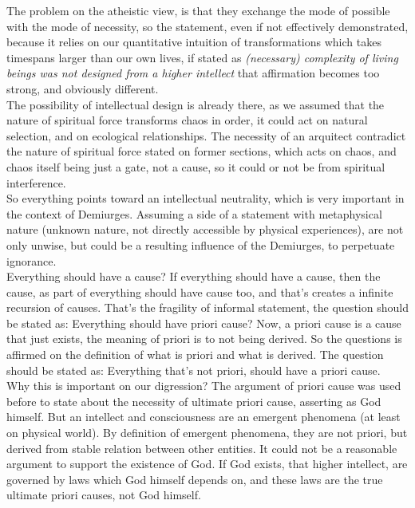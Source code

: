 \documentclass[12pt,a4paper]{article}
\begin{document}
The problem on the atheistic view, is that they exchange the mode of possible with the mode of necessity, so the statement, even if not effectively demonstrated, because it relies on our quantitative intuition of transformations which takes timespans larger than our own lives, if stated as \textit{(necessary) complexity of living beings was not designed from a higher intellect } that affirmation becomes too strong, and obviously different. \\

The possibility of intellectual design is already there, as we assumed that the nature of spiritual force transforms chaos in order, it could act on natural selection, and on ecological relationships. The necessity of an arquitect contradict the nature of spiritual force stated on former sections, which acts on chaos, and chaos itself being just a gate, not a cause, so it could or not be from spiritual interference. \\

So everything points toward an intellectual neutrality, which is very important in the context of Demiurges. Assuming a side of a statement with metaphysical nature (unknown nature, not directly accessible by physical experiences), are not only unwise, but could be a resulting influence of the Demiurges, to perpetuate ignorance. \\

Everything should have a cause? If everything should have a cause, then the cause, as part of everything should have cause too, and that's creates a infinite recursion of causes. That's the fragility of informal statement, the question should be stated as: Everything should have priori cause? Now, a priori cause is a cause that just exists, the meaning of priori is to not being derived. So the questions is affirmed on the definition of what is priori and what is derived. The question should be stated as: Everything that's not priori, should have a priori cause.\\

Why this is important on our digression? The argument of priori cause was used before to state about the necessity of ultimate priori cause, asserting as God himself. But an intellect and consciousness are an emergent phenomena (at least on physical world). By definition of emergent phenomena, they are not priori, but derived from stable relation between other entities. It could not be a reasonable argument to support the existence of God. If God exists, that higher intellect, are governed by laws which God himself depends on, and these laws are the true ultimate priori causes, not God himself.\\
\end{document}
